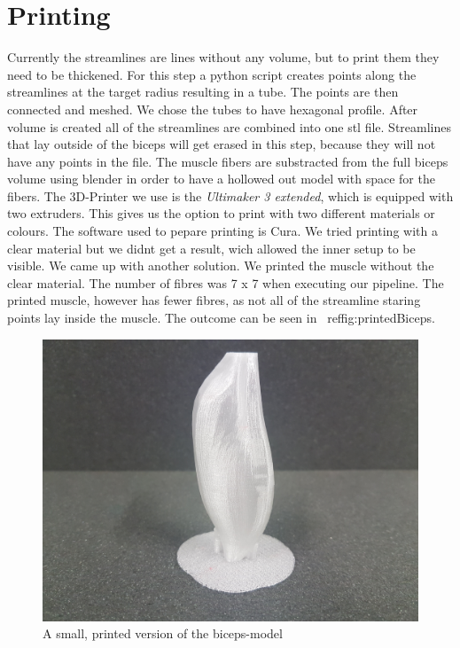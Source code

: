 \documentclass[preprint,journal]{vgtc}       %
\begin{document}
\section{Printing}
Currently the streamlines are lines without any volume, but to print them they need to be thickened. 
For this step a python script creates points along the streamlines at the target radius resulting in a tube.
The points are then connected and meshed. 
We chose the tubes to have hexagonal profile.
After volume is created all of the streamlines are combined into one stl file. 
Streamlines that lay outside of the biceps will get erased in this step, because they will not have any points in the file. 
The muscle fibers are substracted from the full biceps volume using blender in order to have a hollowed out model with space for the fibers. 
The 3D-Printer we use is the \textit{Ultimaker 3 extended}, which is equipped with two extruders. 
This gives us the option to print with two different materials or colours. %
The software used to pepare printing is Cura. 
We tried printing with a clear material but we didnt get a result, wich allowed the inner setup to be visible. 
We came up with another solution. 
We printed the muscle without the clear material. 
The number of fibres was 7 x 7 when executing our pipeline. 
The printed muscle, however has fewer fibres, as not all of the streamline staring points lay inside the muscle. 
The outcome can be seen in ~ref{fig:printedBiceps}. 

\begin{figure}[H]
		\includegraphics[width=.8\linewidth]{small_print.jpg}
		\caption{A small, printed version of the biceps-model}
		\label{fig:printedBiceps}
\end{figure}
\end{document}
